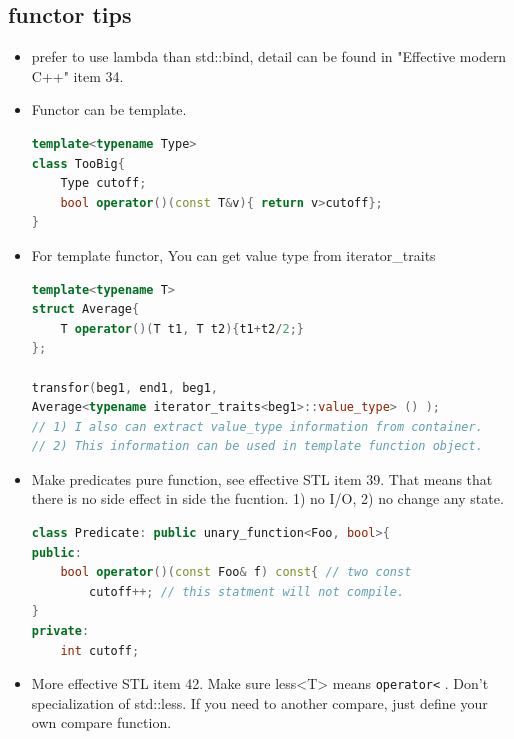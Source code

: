 \documentclass[a4paper,11pt,twoside]{book}
\begin{document}
\subsection{functor tips}

\begin{itemize}

	\item prefer to use lambda than std::bind, detail can be found in "Effective modern C++" item 34.

\item Functor can be template.
\begin{lstlisting}[frame=single, language=c++]
template<typename Type>
class TooBig{
	Type cutoff;
	bool operator()(const T&v){ return v>cutoff};
}
\end{lstlisting}

\item For template functor, You can get value type from iterator\_traits
\begin{lstlisting}[frame=single, language=c++]
template<typename T>
struct Average{
	T operator()(T t1, T t2){t1+t2/2;}
};

transfor(beg1, end1, beg1,
Average<typename iterator_traits<beg1>::value_type> () );
// 1) I also can extract value_type information from container.
// 2) This information can be used in template function object.
\end{lstlisting}



\item Make predicates pure function, see effective STL item 39. That means that there is no side effect in side the fucntion. 1) no I/O, 2) no change any state.
\begin{lstlisting}[frame=single, language=c++]
class Predicate: public unary_function<Foo, bool>{
public:
	bool operator()(const Foo& f) const{ // two const
		cutoff++; // this statment will not compile.
}
private:
	int cutoff;
\end{lstlisting}


\item More effective STL item 42. Make sure less<T> means \texttt{operator<} . Don't specialization of std::less. If you need to another compare, just define your own compare function.
\end{itemize}
\end{document}
